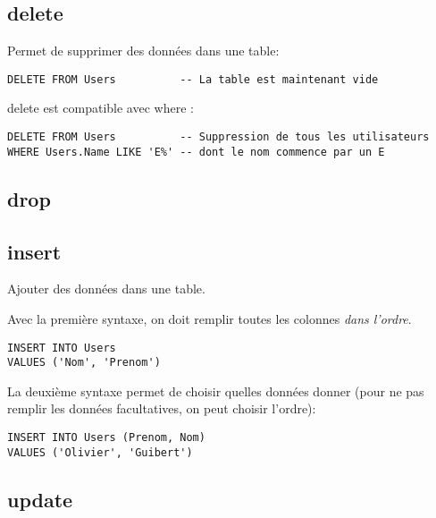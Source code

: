 \documentclass[10pt,a4paper,french]{article}
\begin{document}
\subsection{\gls{delete}}

Permet de supprimer des données dans une table:
\begin{verbatim}
DELETE FROM Users          -- La table est maintenant vide
\end{verbatim}

\gls{delete} est compatible avec \gls{where} :
\begin{verbatim}
DELETE FROM Users          -- Suppression de tous les utilisateurs
WHERE Users.Name LIKE 'E%' -- dont le nom commence par un E
\end{verbatim}

\subsection{\gls{drop}}

\subsection{\gls{insert}}\label{insert}

Ajouter des données dans une table.

Avec la première syntaxe, on doit remplir toutes les colonnes \textit{dans l'ordre}.
\begin{verbatim}
INSERT INTO Users
VALUES ('Nom', 'Prenom')
\end{verbatim}

La deuxième syntaxe permet de choisir quelles données donner (pour ne pas remplir les données facultatives, on peut choisir l'ordre):
\begin{verbatim}
INSERT INTO Users (Prenom, Nom)
VALUES ('Olivier', 'Guibert')
\end{verbatim}

\subsection{\gls{update}}\label{update}

\section{}

\section{}
\end{document}
